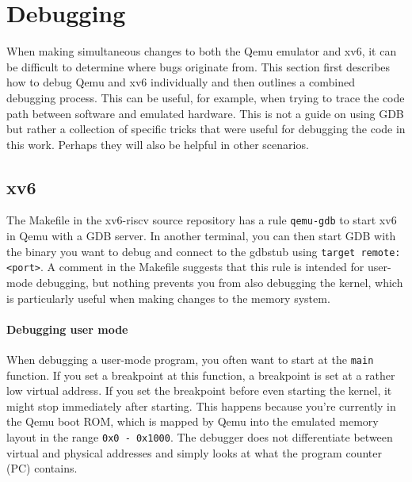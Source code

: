 


\section{Debugging}
When making simultaneous changes to both the Qemu emulator and xv6, it can be difficult to determine where bugs originate from. This section first describes how to debug Qemu and xv6 individually and then outlines a combined debugging process. This can be useful, for example, when trying to trace the code path between software and emulated hardware. This is not a guide on using GDB but rather a collection of specific tricks that were useful for debugging the code in this work. Perhaps they will also be helpful in other scenarios.

\subsection{xv6}
The Makefile in the xv6-riscv source repository has a rule \texttt{qemu-gdb} to start xv6 in Qemu with a GDB server. In another terminal, you can then start GDB with the binary you want to debug and connect to the gdbstub using \texttt{target remote:<port>}. A comment in the Makefile suggests that this rule is intended for user-mode debugging, but nothing prevents you from also debugging the kernel, which is particularly useful when making changes to the memory system.

\paragraph{Debugging user mode} When debugging a user-mode program, you often want to start at the \texttt{main} function. If you set a breakpoint at this function, a breakpoint is set at a rather low virtual address. If you set the breakpoint before even starting the kernel, it might stop immediately after starting. This happens because you're currently in the Qemu boot ROM, which is mapped by Qemu into the emulated memory layout in the range \texttt{0x0 - 0x1000}. The debugger does not differentiate between virtual and physical addresses and simply looks at what the program counter (PC) contains. 

